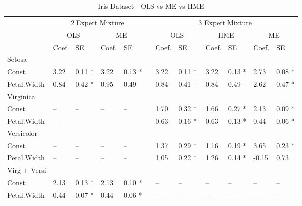 \documentclass[12pt]{article}
\theoremstyle{definition}
\begin{document}
\begin{landscape}
\begin{table} 
	\caption{Iris Dataset - OLS vs ME vs HME}
	\begin{threeparttable}
		\begin{tabular}[l]{l l l l l l l l l l l l}
  \cmidrule{1-12}

  & \multicolumn{4}{c}{2 Expert Mixture} & & \multicolumn{6}{c}{3 Expert Mixture} \\
  \cmidrule(r){2-5}  \cmidrule(r){7-12}
  & \multicolumn{2}{c}{OLS}  & \multicolumn{2}{c}{ME} & & \multicolumn{2}{c}{OLS}  & \multicolumn{2}{c}{HME}  & \multicolumn{2}{c}{ME} \\
  \cmidrule(r){2-3}  \cmidrule(r){4-5}  \cmidrule(r){7-8}  \cmidrule(r){9-10}  \cmidrule(r){11-12}
  & Coef. & SE & Coef. & SE && Coef. & SE & Coef. & SE & Coef. & SE     \\
  \cmidrule{1-12}
  
  Setosa \\
  \cmidrule(r){1-1}
  Const.             & 3.22 & 0.11 *  & 3.22 & 0.13 *   && 3.22  & 0.11 * & 3.22 & 0.13 * & 2.73  & 0.08 *       \\
  Petal.Width        & 0.84 & 0.42 *  & 0.95 & 0.49 -   && 0.84  & 0.41 + & 0.84 & 0.49 - & 2.62  & 0.47 *       \\[0.3cm]
  
  Virginica \\
  \cmidrule(r){1-1}
  Const.             & --   & --     & --   & --        && 1.70  & 0.32 * & 1.66 & 0.27 * & 2.13  & 0.09 *       \\
  Petal.Width        & --   & --     & --   & --        && 0.63  & 0.16 * & 0.63 & 0.13 * & 0.44  & 0.06 *       \\[0.3cm]
  
  Versicolor \\
  \cmidrule(r){1-1}
  Const.             & --   & --     & --   & --        && 1.37  & 0.29 * & 1.16 & 0.19 * & 3.65  & 0.23 *       \\
  Petal.Width        & --   & --     & --   & --        && 1.05  & 0.22 * & 1.26 & 0.14 * & -0.15 & 0.73         \\[0.3cm]

  Virg + Versi \\
  \cmidrule(r){1-1}
  Const.             & 2.13 & 0.13 * & 2.13 & 0.10 *    && --    & --     & --   & --     & --    & --           \\
  Petal.Width        & 0.44 & 0.07 * & 0.44 & 0.06 *    && --    & --     & --   & --     & --    & --           \\[0.3cm]


\end{tabular}
\end{threeparttable}
\end{table}
\end{landscape}
\end{document}
